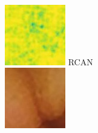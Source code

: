 \documentclass[conference]{IEEEtran}
\begin{document}
\begin{figure}[!t]
        \\
        \vfill
        \includegraphics[width=\linewidth]{Figures/983/983_RCAN_ssim.jpg}
        RCAN\\
    \endminipage\hfill
        \centering
        \includegraphics[width=\linewidth]{Figures/983/983_proposed.jpg}
      

\end{figure}
\end{document}

